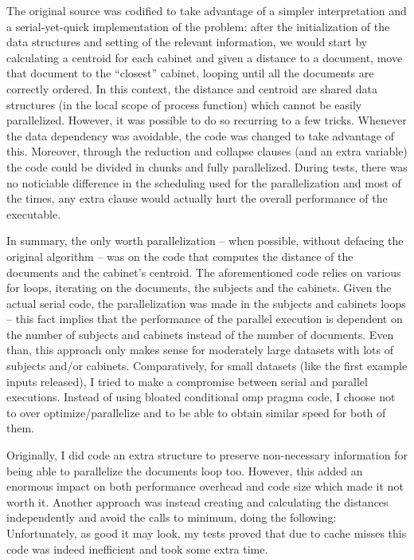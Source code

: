 \documentclass[times, 10pt,twocolumn]{article}
\begin{document}
	The original source was codified to take advantage of a simpler interpretation and a serial-yet-quick implementation of the problem: after the initialization of the data structures and setting of the relevant information, we would start by calculating a centroid for each cabinet and given a distance to a document, move that document to the “closest” cabinet, looping until all the documents are correctly ordered. In this context, the distance and centroid are shared data structures (in the local scope of process function) which cannot be easily parallelized. However, it was possible to do so recurring to a few tricks. Whenever the data dependency was avoidable, the code was changed to take advantage of this. Moreover, through the reduction and collapse clauses (and an extra variable) the code could be divided in chunks and fully parallelized. During tests, there was no noticiable difference in the scheduling used for the parallelization and most of the times, any extra clause would actually hurt the overall performance of the executable.

	In summary, the only worth parallelization – when possible, without defacing the original algorithm –  was on the code that computes the distance of the documents and the cabinet's centroid. The aforementioned code relies on various for loops, iterating on the documents, the subjects and the cabinets. Given the actual serial code, the parallelization was made in the subjects and cabinets loops – this fact implies that the performance of the parallel execution is dependent on the number of subjects and cabinets instead of the number of documents. 
	Even than, this approach only makes sense for moderately large datasets with lots of subjects and/or cabinets. Comparatively, for small datasets (like the first example inputs released), I tried to make a compromise between serial and parallel executions. Instead of using bloated conditional omp pragma code, I choose not to over optimize/parallelize and to be able to obtain similar speed for both of them.

	Originally, I did code an extra structure to preserve non-necessary information for being able to parallelize the documents loop too. However, this added an enormous impact on both performance overhead and code size which made it not worth it. Another approach was instead creating and calculating the distances independently and avoid the calls to minimum, doing the following:
	Unfortunately, as good it may look, my tests proved that due to cache misses this code was indeed inefficient and took some extra time.
\end{document}
